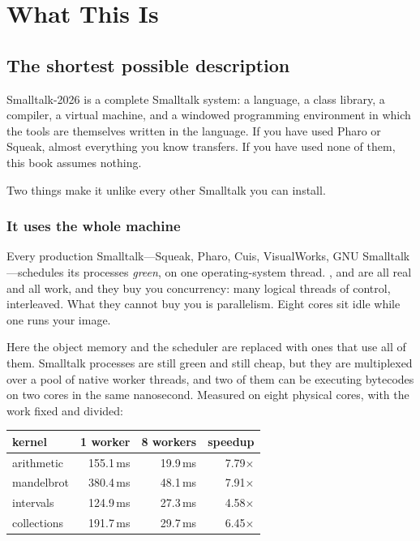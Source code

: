 \chapter{What This Is}


\section{The shortest possible description}

Smalltalk-2026 is a complete Smalltalk system: a language, a class library, a
compiler, a virtual machine, and a windowed programming environment in which
the tools are themselves written in the language. If you have used Pharo or
Squeak, almost everything you know transfers. If you have used none of them,
this book assumes nothing.

Two things make it unlike every other Smalltalk you can install.

\subsection{It uses the whole machine}

Every production Smalltalk---Squeak, Pharo, Cuis, VisualWorks, GNU
Smalltalk---schedules its processes \emph{green}, on one operating-system
thread. ,  and  are all real
and all work, and they buy you concurrency: many logical threads of control,
interleaved. What they cannot buy you is parallelism. Eight cores sit idle
while one runs your image.

Here the object memory and the scheduler are replaced with ones that use all
of them. Smalltalk processes are still green and still cheap, but they are
multiplexed over a pool of native worker threads, and two of them can be
executing bytecodes on two cores in the same nanosecond. Measured on eight
physical cores, with the work fixed and divided:

\begin{center}
\small
\begin{tabular}{@{}lrrr@{}}
\toprule
kernel & 1 worker & 8 workers & speedup\\
\midrule
arithmetic  & 155.1\,ms & 19.9\,ms & 7.79$\times$\\
mandelbrot  & 380.4\,ms & 48.1\,ms & 7.91$\times$\\
intervals   & 124.9\,ms & 27.3\,ms & 4.58$\times$\\
collections & 191.7\,ms & 29.7\,ms & 6.45$\times$\\
\bottomrule
\end{tabular}
\end{center}

